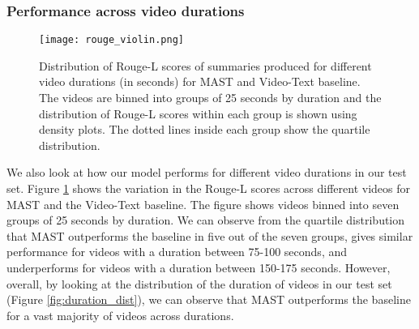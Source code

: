 \documentclass[11pt,a4paper]{article}
\begin{document}
\subsubsection{Performance across video durations}

\begin{figure}
    \centering
    \texttt{[image: rouge\_violin.png]}
    \caption{Distribution of Rouge-L scores of summaries produced for different video durations (in seconds) for MAST and Video-Text baseline. The videos are binned into groups of 25 seconds by duration and the distribution of Rouge-L scores within each group is shown using density plots. The dotted lines inside each group show the quartile distribution.}
    \label{fig:rouge_dist}
    \vspace{-3.5mm}
\end{figure}

We also look at how our model performs for different video durations in our test set. Figure \ref{fig:rouge_dist} shows the variation in the Rouge-L scores across different videos for MAST and the Video-Text baseline. The figure shows videos binned into seven groups of 25 seconds by duration. We can observe from the quartile distribution that MAST outperforms the baseline in five out of the seven groups, gives similar performance for videos with a duration between 75-100 seconds, and underperforms for videos with a duration between 150-175 seconds. However, overall, by looking at the distribution of the duration of videos in our test set (Figure \ref{fig:duration_dist}), we can observe that MAST outperforms the baseline for a vast majority of videos across durations.
\end{document}
